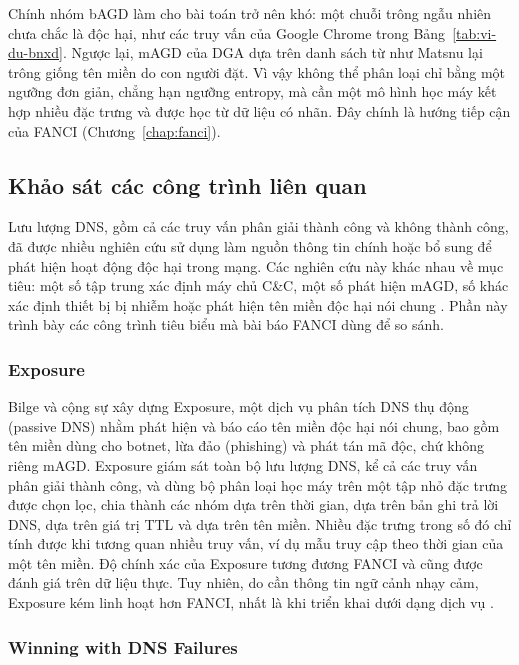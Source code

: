 Chính nhóm bAGD làm cho bài toán trở nên khó: một chuỗi trông ngẫu nhiên chưa chắc là độc hại, như các truy vấn của Google Chrome trong Bảng~\ref{tab:vi-du-bnxd}. Ngược lại, mAGD của DGA dựa trên danh sách từ như Matsnu lại trông giống tên miền do con người đặt. Vì vậy không thể phân loại chỉ bằng một ngưỡng đơn giản, chẳng hạn ngưỡng entropy, mà cần một mô hình học máy kết hợp nhiều đặc trưng và được học từ dữ liệu có nhãn. Đây chính là hướng tiếp cận của FANCI (Chương~\ref{chap:fanci}).

\subsection{Khảo sát các công trình liên quan}\label{sec:khao-sat}

Lưu lượng DNS, gồm cả các truy vấn phân giải thành công và không thành công, đã được nhiều nghiên cứu sử dụng làm nguồn thông tin chính hoặc bổ sung để phát hiện hoạt động độc hại trong mạng. Các nghiên cứu này khác nhau về mục tiêu: một số tập trung xác định máy chủ C\&C, một số phát hiện mAGD, số khác xác định thiết bị bị nhiễm hoặc phát hiện tên miền độc hại nói chung \cite{schuppen2018fanci}. Phần này trình bày các công trình tiêu biểu mà bài báo FANCI dùng để so sánh.

\subsubsection{Exposure}

Bilge và cộng sự \cite{bilge2014exposure} xây dựng Exposure, một dịch vụ phân tích DNS thụ động (passive DNS) nhằm phát hiện và báo cáo tên miền độc hại nói chung, bao gồm tên miền dùng cho botnet, lừa đảo (phishing) và phát tán mã độc, chứ không riêng mAGD. Exposure giám sát toàn bộ lưu lượng DNS, kể cả các truy vấn phân giải thành công, và dùng bộ phân loại học máy trên một tập nhỏ đặc trưng được chọn lọc, chia thành các nhóm dựa trên thời gian, dựa trên bản ghi trả lời DNS, dựa trên giá trị TTL và dựa trên tên miền. Nhiều đặc trưng trong số đó chỉ tính được khi tương quan nhiều truy vấn, ví dụ mẫu truy cập theo thời gian của một tên miền. Độ chính xác của Exposure tương đương FANCI và cũng được đánh giá trên dữ liệu thực. Tuy nhiên, do cần thông tin ngữ cảnh nhạy cảm, Exposure kém linh hoạt hơn FANCI, nhất là khi triển khai dưới dạng dịch vụ \cite{schuppen2018fanci}.

\subsubsection{Winning with DNS Failures}

